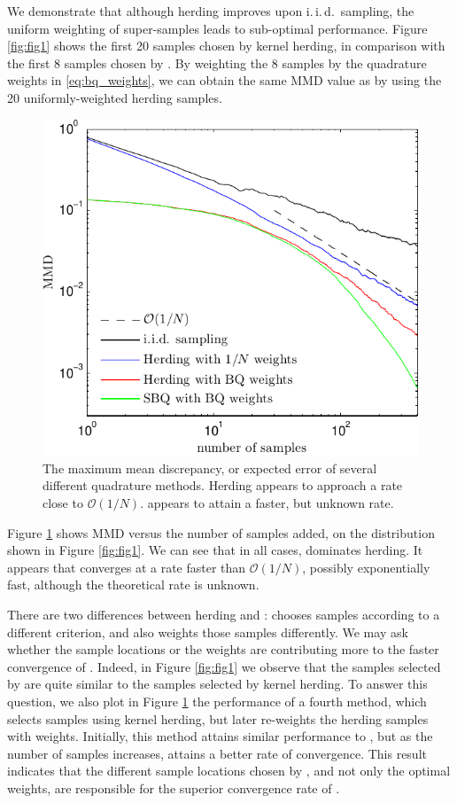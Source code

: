We demonstrate that although herding improves upon i.\,i.\,d.\ sampling, the uniform weighting of super-samples leads to sub-optimal performance. Figure \ref{fig:fig1} shows the first 20 samples chosen by kernel herding, in comparison with the first 8 samples chosen by \sbq{}. By weighting the 8 \sbq{} samples by the quadrature weights in \eqref{eq:bq_weights}, we can obtain the same MMD value as by using the 20 uniformly-weighted herding samples. 

\begin{figure}[t]
\centering
\includegraphics[width=.8\columnwidth]{figs/herding/expected_variance_v7_400}
\caption[Discrepancy of Bayesian quadrature, herding and random sampling]{The maximum mean discrepancy, or expected error of several different quadrature methods. Herding appears to approach a rate close to $\mathcal{O}(1/N)$. \sbq{} appears to attain a faster, but unknown rate.}
\label{fig:mmd_curve}
\end{figure}

Figure \ref{fig:mmd_curve} shows MMD versus the number of samples added, on the distribution shown in Figure \ref{fig:fig1}. We can see that in all cases, \sbq{} dominates herding. It appears that \sbq{} converges at a rate faster than $\mathcal{O}(1/N)$, possibly exponentially fast, although the theoretical rate is unknown.

There are two differences between herding and \sbq{}:  \sbq{} chooses samples according to a different criterion, and also weights those samples differently. We may ask whether the sample locations or the weights are contributing more to the faster convergence of \sbq{}. Indeed, in Figure \ref{fig:fig1} we observe that the samples selected by \sbq{} are quite similar to the samples selected by kernel herding. To answer this question, we also plot in Figure \ref{fig:mmd_curve} the performance of a fourth method, which selects samples using kernel herding, but later re-weights the herding samples with \bq{} weights. Initially, this method attains similar performance to \sbq{}, but as the number of samples increases, \sbq{} attains a better rate of convergence. This result indicates that the different sample locations chosen by \sbq{}, and not only the optimal weights, are responsible for the superior convergence rate of \sbq{}.

